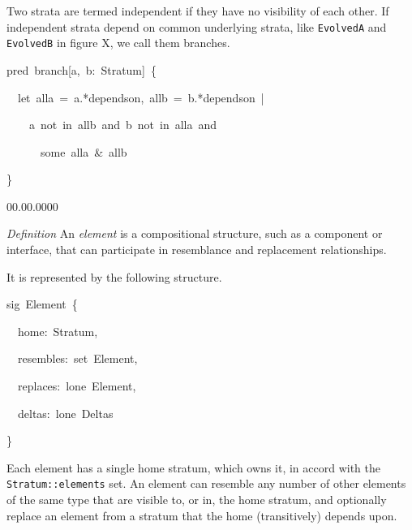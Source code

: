 Two strata are termed independent if they have no visibility of each
other. If independent strata depend on common underlying strata, like
\texttt{EvolvedA} and \texttt{EvolvedB} in figure X, we call them
branches.
\begin{lyxcode}
{\footnotesize{}pred~branch{[}a,~b:~Stratum{]}~\{}{\footnotesize \par}

{\footnotesize{}~~let~alla~=~a.{*}dependson,~allb~=~b.{*}dependson~|}{\footnotesize \par}

{\footnotesize{}~~~~a~not~in~allb~and~b~not~in~alla~and}{\footnotesize \par}

{\footnotesize{}~~~~~~some~alla~\&~allb}{\footnotesize \par}

{\footnotesize{}\}}{\footnotesize \par}\end{lyxcode}
\begin{lyxlist}{00.00.0000}
\item [{\emph{Definition}}] An \emph{element} is a compositional structure,
such as a component or interface, that can participate in resemblance
and replacement relationships.
\end{lyxlist}
It is represented by the following structure.
\begin{lyxcode}
{\footnotesize{}sig~Element~\{}{\footnotesize \par}

{\footnotesize{}~~home:~Stratum,}{\footnotesize \par}

{\footnotesize{}~~resembles:~set~Element,}{\footnotesize \par}

{\footnotesize{}~~replaces:~lone~Element,}{\footnotesize \par}

{\footnotesize{}~~deltas:~lone~Deltas}{\footnotesize \par}

{\footnotesize{}\}}{\footnotesize \par}
\end{lyxcode}
Each element has a single home stratum, which owns it, in accord with
the \texttt{Stratum::elements} set. An element can resemble any number
of other elements of the same type that are visible to, or in, the
home stratum, and optionally replace an element from a stratum that
the home (transitively) depends upon.

